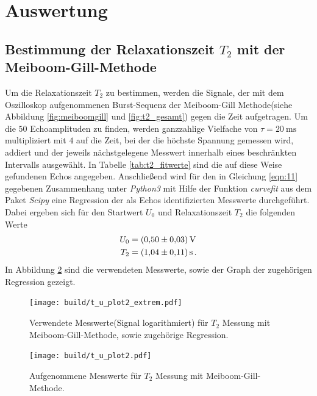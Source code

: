 \section{Auswertung}
\label{sec:Auswertung}

\subsection{Bestimmung der Relaxationszeit $T_{2}$ mit der Meiboom-Gill-Methode}
\label{subsec:T2}

Um die Relaxationszeit $T_{2}$ zu bestimmen, werden die Signale, der mit dem Oszilloskop aufgenommenen
Burst-Sequenz der Meiboom-Gill Methode(siehe Abbildung \ref{fig:meiboomgill} und \ref{fig:t2_gesamt}) gegen die Zeit aufgetragen.
Um die $50$ Echoamplituden zu finden, werden ganzzahlige Vielfache von $\tau = \SI{20}{\milli\second}$ multipliziert mit $4$
auf die Zeit, bei der die höchste Spannung gemessen wird, addiert und der jeweils nächstgelegene Messwert innerhalb eines beschränkten Intervalls ausgewählt.
In Tabelle \ref{tab:t2_fitwerte}
sind die auf diese Weise gefundenen Echos angegeben.
Anschließend wird für den in Gleichung \eqref{eqn:11} gegebenen Zusammenhang unter \textit{Python3} mit Hilfe der Funktion \textit{curvefit} aus
dem Paket \textit{Scipy} eine Regression der als Echos identifizierten Messwerte durchgeführt.\\
Dabei ergeben sich für den Startwert $U_{0}$ und Relaxationszeit $T_{2}$ die folgenden Werte
\begin{align*}
  U_{0} &= \SI{0.50+-0.03}{\volt} \\
  T_{2} &= \SI{ 1.04+-0.11}{\second} \, .
\end{align*}
In Abbildung \ref{fig:t2_plot} sind die verwendeten Messwerte, sowie der Graph der zugehörigen Regression
gezeigt.\\


\begin{figure}[hhh]
  \centering
  \texttt{[image: build/t\_u\_plot2\_extrem.pdf]}
  \caption{Verwendete Messwerte(Signal logarithmiert) für $T_{2}$ Messung mit Meiboom-Gill-Methode, sowie zugehörige Regression.}
  \label{fig:t2_plot_gesamt}
\end{figure}


\begin{figure}[hhh]
  \centering
  \texttt{[image: build/t\_u\_plot2.pdf]}
  \caption{Aufgenommene Messwerte für $T_{2}$ Messung mit Meiboom-Gill-Methode.}
  \label{fig:t2_plot}
\end{figure}


